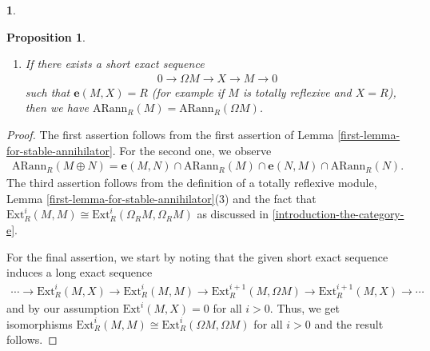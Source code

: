 \documentclass[12pt]{amsart}
\newcommand{\Ext}{\mathrm{Ext}}
\newcommand{\arann}{\mathrm{ARann}}
\newtheorem{proposition}[theorem]{Proposition}
\theoremstyle{definition}
\newtheorem{chunk}[theorem]{}
\numberwithin{equation}{theorem}
\def\e{\boldsymbol{e}}
\begin{document}
\begin{chunk}
\begin{proposition}
\begin{enumerate}
            \item If there exists a short exact sequence 
            \begin{align*}
            0 \to \Omega M \to X \to M \to 0
            \end{align*}
            such that $\e(M,X) = R$ (for example if $M$ is totally reflexive and $X = R$), then we have $\arann_R(M) = \arann_R(\Omega M)$. 
        \end{enumerate}
    \end{proposition}
    \begin{proof}
        The first assertion follows from the first assertion of Lemma \ref{first-lemma-for-stable-annihilator}. For the second one, we observe
        \begin{align}\label{auslander-reiten-annihilator-direct-sum}
            \arann_R(M \oplus N) = \e(M,N) \cap \arann_R(M) \cap \e(N,M) \cap \arann_R(N). 
        \end{align}
        The third assertion follows from the definition of a totally reflexive module, Lemma \ref{first-lemma-for-stable-annihilator}(3) and the fact that $\Ext_R^i(M, M) \cong \Ext_R^{i}(\Omega_R M, \Omega_R M)$ as discussed in \ref{introduction-the-category-e}.

        For the final assertion, we start by noting that the given short exact sequence induces a long exact sequence 
        \begin{align*}
        \cdots \to \Ext_R^i(M, X) \to \Ext_R^i(M,M) \to \Ext_R^{i+1}(M, \Omega M) \to \Ext_R^{i+1}(M,X) \to \cdots
        \end{align*}
        and by our assumption $\Ext^i(M,X) = 0$ for all $i > 0$. Thus, we get isomorphisms $\Ext_R^i(M,M) \cong \Ext_R^i(\Omega M, \Omega M)$ for all $i > 0$ and the result follows.
    \end{proof}
\end{chunk}
\end{document}
